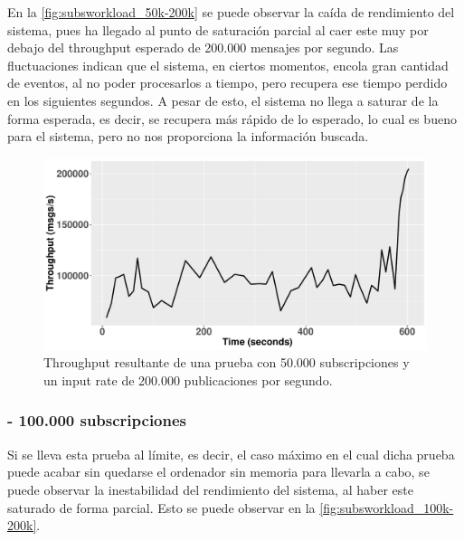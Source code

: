 En la \autoref{fig:subsworkload_50k-200k} se puede observar la caída de rendimiento
del sistema, pues ha llegado al punto de saturación parcial al caer este muy por debajo
del throughput esperado de 200.000 mensajes por segundo. Las fluctuaciones 
indican que el sistema, en ciertos momentos, encola gran cantidad de eventos, al
no poder procesarlos a tiempo, pero recupera ese tiempo perdido en los siguientes
segundos. A pesar de esto, el sistema no llega a saturar de la forma esperada, es decir,
se recupera más rápido de lo esperado, lo cual es bueno para el sistema, pero no nos 
proporciona la información buscada.

\begin{figure}[htpb]
    \centering
    \includegraphics[width=\textwidth]{images/th_subs_workload-50k-200k.pdf}
    \caption{Throughput resultante de una prueba con 50.000 subscripciones y un input rate de 200.000 publicaciones por segundo.}
    \label{fig:subsworkload_50k-200k}
\end{figure}

\subsubsection*{- 100.000 subscripciones}

Si se lleva esta prueba al límite, es decir, el caso máximo en el cual dicha prueba puede
acabar sin quedarse el ordenador sin memoria para llevarla a cabo, se puede observar
la inestabilidad del rendimiento del sistema, al haber este saturado de forma parcial.
Esto se puede observar en la \autoref{fig:subsworkload_100k-200k}.

